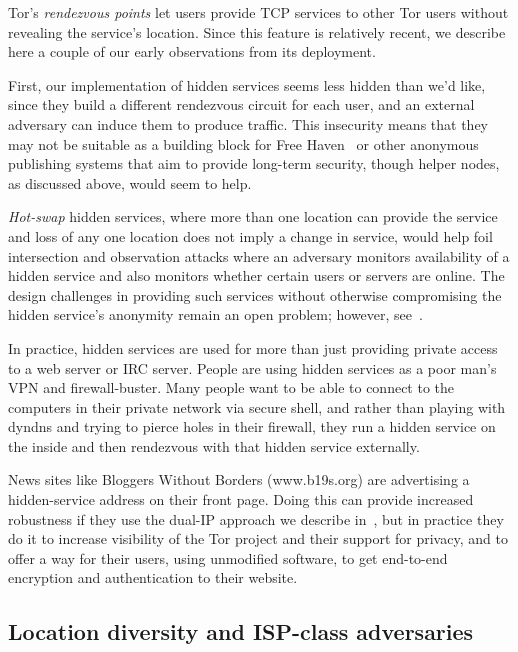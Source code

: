 \documentclass{llncs}
\begin{document}
Tor's \emph{rendezvous points}
let users provide TCP services to other Tor users without revealing
the service's location. Since this feature is relatively recent, we describe
here
a couple of our early observations from its deployment.

First, our implementation of hidden services seems less hidden than we'd
like, since they build a different rendezvous circuit for each user,
and an external adversary can induce them to
produce traffic. This insecurity means that they may not be suitable as
a building block for Free Haven~\cite{freehaven-berk} or other anonymous
publishing systems that aim to provide long-term security, though helper
nodes, as discussed above, would seem to help.

\emph{Hot-swap} hidden services, where more than one location can
provide the service and loss of any one location does not imply a
change in service, would help foil intersection and observation attacks
where an adversary monitors availability of a hidden service and also
monitors whether certain users or servers are online. The design
challenges in providing such services without otherwise compromising
the hidden service's anonymity remain an open problem;
however, see~\cite{move-ndss05}.

In practice, hidden services are used for more than just providing private
access to a web server or IRC server. People are using hidden services
as a poor man's VPN and firewall-buster. Many people want to be able
to connect to the computers in their private network via secure shell,
and rather than playing with dyndns and trying to pierce holes in their
firewall, they run a hidden service on the inside and then rendezvous
with that hidden service externally.

News sites like Bloggers Without Borders (www.b19s.org) are advertising
a hidden-service address on their front page. Doing this can provide
increased robustness if they use the dual-IP approach we describe
in~\cite{tor-design},
but in practice they do it to increase visibility
of the Tor project and their support for privacy, and to offer
a way for their users, using unmodified software, to get end-to-end
encryption and authentication to their website.

\subsection{Location diversity and ISP-class adversaries}
\label{subsec:routing-zones}
\end{document}
